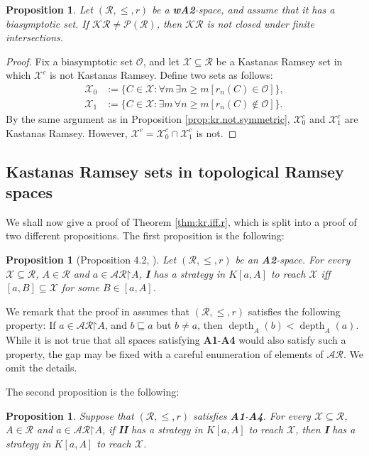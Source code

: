 \documentclass[11pt,reqno]{amsart}
\theoremstyle{plain}
\numberwithin{equation}{section}
\newtheorem{proposition}[theorem]{Proposition}
\theoremstyle{definition}
\newcommand{\func}{\operatorname}
\newcommand{\Po}{\cal{P}}
\newcommand{\cal}{\mathcal}
\newcommand{\bcal}[1]{\bm{\mathcal{#1}}}
\newcommand{\restrictedto}{\mathord{\upharpoonright}}
\newcommand{\X}{\cal{X}}
\renewcommand{\O}{\cal{O}}
\newcommand{\depth}{\func{depth}}
\begin{document}
\begin{proposition}
\label{prop:kr.not.closed.under.intersections}
    Let $(\cal{R},\leq,r)$ be a \textbf{wA2}-space, and assume that it has a biasymptotic set. If $\bcal{KR} \neq \Po(\cal{R})$, then $\bcal{KR}$ is not closed under finite intersections.
\end{proposition}

\begin{proof}
    Fix a biasymptotic set $\O$, and let $\X \subseteq \cal{R}$ be a Kastanas Ramsey set in which $\X^c$ is not Kastanas Ramsey. Define two sets as follows:
    \begin{align*}
        \X_0 &:= \{C \in \X : \forall m \, \exists n \geq m[r_n(C) \in \O]\}, \\
        \X_1 &:= \{C \in \X : \exists m \, \forall n \geq m[r_n(C) \notin \O]\}.
    \end{align*}
    By the same argument as in Proposition \ref{prop:kr.not.symmetric}, $\X_0^c$ and $\X_1^c$ are Kastanas Ramsey. However, $\X^c = \X_0^c \cap \X_1^c$ is not.
\end{proof}

\subsection{Kastanas Ramsey sets in topological Ramsey spaces} We shall now give a proof of Theorem \ref{thm:kr.iff.r}, which is split into a proof of two different propositions. The first proposition is the following:

\begin{proposition}[Proposition 4.2, \cite{CD23}]
\label{prop:kr.equals.r.for.I}
    Let $(\cal{R},\leq,r)$ be an \textbf{A2}-space. For every $\X \subseteq \cal{R}$, $A \in \cal{R}$ and $a \in \cal{AR}\restrictedto A$, \textbf{I} has a strategy in $K[a,A]$ to reach $\X$ iff $[a,B] \subseteq \X$ for some $B \in [a,A]$.
\end{proposition}

We remark that the proof in \cite{CD23} assumes that $(\cal{R},\leq,r)$ satisfies the following property: If $a \in \cal{AR}\restrictedto A$, and $b \sqsubseteq a$ but $b \neq a$, then $\depth_A(b) < \depth_A(a)$. While it is not true that all spaces satisfying \textbf{A1}-\textbf{A4} would also satisfy such a property, the gap may be fixed with a careful enumeration of elements of $\cal{AR}$. We omit the details.

The second proposition is the following:


\begin{proposition}
\label{prop:kr.II.strategy.gives.I}
    Suppose that $(\cal{R},\leq,r)$ satisfies \textbf{A1}-\textbf{A4}. For every $\X \subseteq \cal{R}$, $A \in \cal{R}$ and $a \in \cal{AR}\restrictedto A$, if \textbf{II} has a strategy in $K[a,A]$ to reach $\X$, then \textbf{I} has a strategy in $K[a,A]$ to reach $\X$.
\end{proposition}
\end{document}
